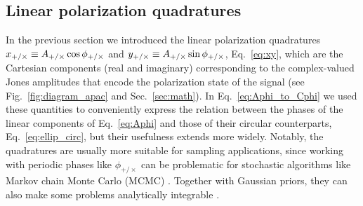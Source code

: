 \documentclass[aps,prd,twocolumn,superscriptaddress,preprintnumbers,floatfix,nofootinbib]{revtex4-2}
\newcommand*{\eq}[1]{Eq.~\eqref{eq:#1}}
\begin{document}
\subsection{Linear polarization quadratures}
\label{sec:jac:Axy}

In the previous section we introduced the linear polarization quadratures $x_{+/\times} \equiv A_{+/\times} \cos \phi_{+/\times}$ and $y_{+/\times} \equiv A_{+/\times} \sin \phi_{+/\times}$, \eq{xy}, which are the Cartesian components (real and imaginary) corresponding to the complex-valued Jones amplitudes that encode the polarization state of the signal (see Fig.~\ref{fig:diagram_apac} and Sec.~\ref{sec:math}).
In \eq{Aphi_to_Cphi} we used these quantities to conveniently express the relation between the phases of the linear components of \eq{Aphi} and those of their circular counterparts, \eq{ellip_circ}, but their usefulness extends more widely.
Notably, the quadratures are usually more suitable for sampling applications, since working with periodic phases like $\phi_{+/\times}$ can be problematic for stochastic algorithms like Markov chain Monte Carlo (MCMC) \cite{Hogg:2017akh}.
Together with Gaussian priors, they can also make some problems analytically integrable \cite{Hogg:2020jwh}.
\end{document}
